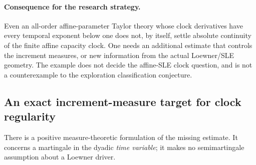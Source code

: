 \documentclass[11pt]{article}
\theoremstyle{definition}\newtheorem{definition}[theorem]{Definition}
\theoremstyle{remark}\newtheorem{remark}[theorem]{Remark}
\begin{document}
\paragraph{Consequence for the research strategy.}
Even an all-order affine-parameter Taylor theory whose clock derivatives
have every temporal exponent below one does not, by itself, settle
absolute continuity of the finite affine capacity clock. One needs an
additional estimate that controls the increment measures, or new
information from the actual Loewner/SLE geometry. The example does not
decide the affine-SLE clock question, and is not a counterexample to the
exploration classification conjecture.

\subsection{An exact increment-measure target for clock regularity}

There is a positive measure-theoretic formulation of the missing estimate.
It concerns a martingale in the dyadic \emph{time variable}; it makes no
semimartingale assumption about a Loewner driver.
\end{document}
